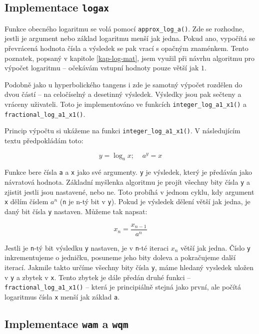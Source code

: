 \documentclass[12pt,a4paper,titlepage,final]{article}
\begin{document}
\subsection{Implementace \texttt{logax}} \label{kap-logax}

Funkce obecného logaritmu se volá pomocí \texttt{approx\_log\_a()}. Zde
se rozhodne, jestli je argument nebo základ logaritmu menší jak jedna. Pokud ano,
vypočítá se převrácená hodnota čísla a výsledek se pak vrací s opačným znaménkem.
Tento poznatek, popsaný v kapitole \ref{kap-log-mat}, jsem využil při návrhu
algoritmu pro výpočet logaritmu -- očekávám vstupní hodnoty pouze větší jak $1$.

Podobně jako u hyperbolického tangens i zde je samotný výpočet rozdělen do dvou
částí -- na celočíselný a desetinný výsledek. Výsledky jsou pak sečteny
a vráceny uživateli. Toto je implementováno ve funkcích \texttt{integer\_log\_a1\_x1()}
a \texttt{fractional\_log\_a1\_x1()}.\newline

\noindent
Princip výpočtu si ukážeme na funkci \texttt{integer\_log\_a1\_x1()}. V následujícím
textu předpokládám toto:

\[
y = \log_a x; \;\;\;\; a^y = x
\]

Funkce bere čísla \texttt{a} a \texttt{x} jako své argumenty. \texttt{y} je výsledek,
který je předáván jako návratová hodnota. Základní myšlenka algoritmu je projít všechny
bity čísla \texttt{y} a zjistit jestli jsou nastavené, nebo ne. Toto probíhá v
jednom cyklu, kdy argument \texttt{x} dělím číslem $a^n$ (\texttt{n} je n-tý bit v
\texttt{y}). Pokud je výsledek dělení větší jak jedna, je daný bit čísla \texttt{y}
nastaven. Můžeme tak napsat:

\[
x_n = \frac{x_{n-1}}{a^n}
\]

Jestli je \texttt{n}-tý bit výsledku \texttt{y} nastaven, je v \texttt{n}-té iteraci
\texttt{$x_n$} větší jak jedna. Číslo \texttt{y} inkrementujeme o jedničku, posuneme
jeho bity doleva a pokračujeme další iterací. Jakmile takto určíme všechny bity čísla \texttt{y},
máme hledaný vysledek uložen v \texttt{y} a zbytek v \texttt{x}. Tento zbytek je
dále předán druhé funkci -- \texttt{fractional\_log\_a1\_x1()} -- která je principiálně
stejná jako první, ale počítá logaritmus čísla \texttt{x} menší jak základ \texttt{a}.

\subsection{Implementace \texttt{wam} a \texttt{wqm}} \label{kap-stat}
\end{document}
